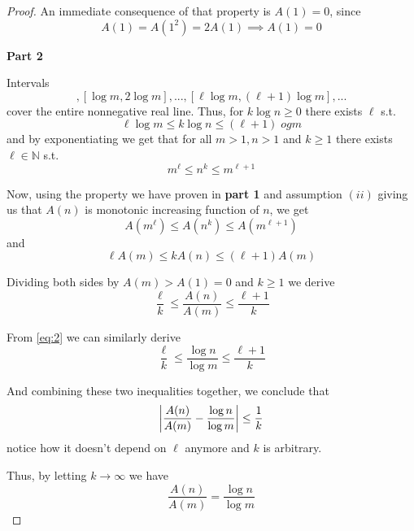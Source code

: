 \documentclass[12pt]{article}
\begin{document}
\begin{proof}
An immediate consequence of that property is $A(1) = 0$, since 
\begin{equation}
    A(1) = A(1^2) = 2A(1) \implies A(1) = 0
\end{equation}

\noindent \textbf{Part 2}

Intervals
\begin{equation}
    [0, \log m], [\log m, 2\log m], ..., [\ell \log m, (\ell + 1) \log m], ...
\end{equation}
cover the entire nonnegative real line. Thus, for $k \log n \geq 0$ there exists $\ell$ s.t. 
\begin{equation}\label{eq:2}
    \ell \log m \leq k \log n \leq (\ell +1 )\;og m
\end{equation}
and by exponentiating we get that for all $m > 1, n > 1$ and $k \geq 1$ there exists $\ell \in \mathbb{N}$ s.t.
\begin{equation}
    m^\ell \leq n^k \leq m^{\ell + 1}
\end{equation}

Now, using the property we have proven in \textbf{part 1} and assumption $(ii)$ giving us that $A(n)$ is monotonic increasing function of $n$, we get 
\begin{equation}
    A(m^\ell) \leq A(n^k) \leq A(m^{\ell +1})
\end{equation}
and 
\begin{equation}
    \ell A(m) \leq k A(n) \leq (\ell +1) A(m)
\end{equation}

Dividing both sides by $A(m) > A(1) = 0$ and $k \geq 1$ we derive
\begin{equation}
    \frac{\ell}{k} \leq \frac{A(n)}{A(m)} \leq \frac{\ell + 1}{k}
\end{equation}

From \eqref{eq:2} we can similarly derive
\begin{equation}
    \frac{\ell}{k} \leq \frac{\log n}{\log m} \leq \frac{\ell +1}{k}
\end{equation}

And combining these two inequalities together, we conclude that 
\begin{equation}
    \abs{\frac{A(n)}{A(m)} - \frac{\log n}{\log m}} \leq \frac{1}{k}
\end{equation}
notice how it doesn't depend on $\ell$ anymore and $k$ is arbitrary.

Thus, by letting $k \to \infty$ we have 
\begin{equation}
    \frac{A(n)}{A(m)} = \frac{\log n}{\log m}
\end{equation}


\end{proof}
\end{document}
